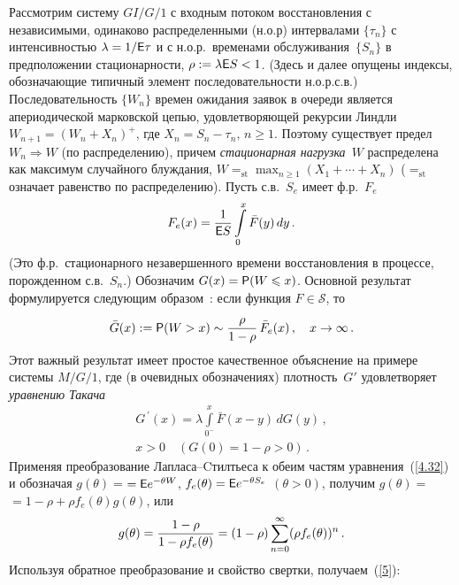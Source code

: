 \begin{multicols}{2}
{Рассмотрим систему $GI/G/1$ с входным потоком восстановления с
независимыми, одинаково распределенными (н.о.р) интервалами
$\{\tau_n\}$ с интенсивностью $\lambda=1/{\sf E}\tau$ и с н.о.р.\
временами обслуживания~$\{S_n\}$ в предположении стационар\-ности,
$\rho:=\lambda{\sf E} S<1$. (Здесь и далее опущены индексы, обозначающие
типичный элемент последовательности н.о.р.с.в.) Последовательность
$\{W_n\}$ времен ожидания заявок в очереди является апериодической
марковской цепью, удовлетворяющей рекурсии Линдли $ W_{n+1} = (W_n +
X_n)^+ $, где $X_n=S_n - \tau_n,\,n \ge 1$. Поэтому существует
предел $W_n \Rightarrow W$ (по распределению), причем {\it
стационарная нагрузка}~$W$ распределена как максимум случайного
блуждания, $W=_{\mathrm{st}}\max_{n\ge 1} (X_1+\cdots+ X_n) $\linebreak
($=_{\mathrm{st}}$
означает равенство по распределению). Пусть с.в.\ $S_e$ имеет ф.р.~$F_e$
\begin{equation}
 F_e(x)= \displaystyle\frac{\displaystyle 1\mathstrut}{\displaystyle {\sf E} S\mathstrut}
 \int\limits_{0}^{x}\bar {F} (y)\, dy\,.
 \label{tail}
\end{equation}
(Это ф.р.\ стационарного незавершенного времени восстановления в
процессе, порожденном с.в.~$S_n$.) Обозначим $G(x)={\sf P}(W\leqslant x)$.
Основной результат формулируется следующим образом~\cite{Asmus, Veraverbeke}: если
функция $F \in \mathcal S$, то
\begin{equation}
\bar G(x):= {\sf P} (W>x)\sim \displaystyle\frac{\displaystyle \rho\mathstrut}{\displaystyle 1-\rho\mathstrut}\,\bar F_e(x)\,,\quad x\to \infty\,.
\label{5}
\end{equation}
Этот важный результат имеет простое качественное объяснение на
примере системы $M/G/1$, где (в очевидных обозначениях) плотность~$G'$
удовлетворяет {\it уравнению Такача}
\begin{multline}
G^{\,'}(x)=\lambda\int\limits_{0^-}^x \bar
F(x-y)\,dG(y)\,,\\
 x>0 \quad(G(0)=1-\rho>0)\,.
\label{4.32}
\end{multline}
Применяя преобразование Лапласа--Cтилтьеса к обеим частям
уравнения~(\ref{4.32}) и обозначая $g (\theta)=$\linebreak $={\sf E} e^{-\theta W}$,
$f_e(\theta)={\sf E} e^{-\theta S_e}$ $(\theta>0)$, получим
$g(\theta)=$\linebreak $= 1-\rho+\rho f_e(\theta)g(\theta)$, или
\begin{equation*}
g(\theta)=\displaystyle\frac{\displaystyle 1-\rho\mathstrut}{\displaystyle 1-\rho f_e(\theta)\mathstrut}=
\left( 1-\rho\right )\sum\limits_{n=0}^\infty (\rho
f_e(\theta))^n\,.
\end{equation*}
Используя обратное преобразование и свойство свертки, получаем~(\ref{5}):
}
\end{multicols}
